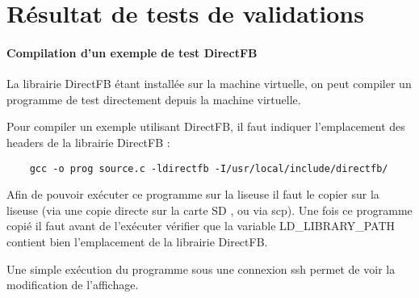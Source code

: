 \chapter{Résultat de tests de validations}


\subsubsection{Compilation d'un exemple de test DirectFB}


La librairie DirectFB étant installée sur la machine virtuelle, on peut compiler un programme de test directement depuis la machine virtuelle.

Pour compiler un exemple utilisant DirectFB, il faut indiquer l'emplacement des headers de la librairie DirectFB : 
\begin{lstlisting}
	gcc -o prog source.c -ldirectfb -I/usr/local/include/directfb/
\end{lstlisting}

Afin de pouvoir exécuter ce programme sur la liseuse il faut le copier sur la liseuse (via une copie directe sur la carte SD , ou via scp).
Une fois ce programme copié il faut avant de l'exécuter vérifier que la variable LD_LIBRARY_PATH contient bien l'emplacement de la librairie DirectFB.

Une simple exécution du programme sous une connexion ssh permet de voir la modification de l'affichage.
